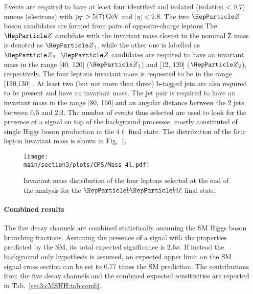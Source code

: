 Events are required to have at least four identified and isolated (isolation < 0.7) muons (electrons) with $\mathrm{p}_{T} > 5(7)\,\text{Ge\hspace{-.08em}V}$ and $|\eta|< 2.8$. 
The two $\PZ$ boson candidates are formed from pairs of opposite-charge leptons
The $\PZ$ candidate with the invariant mass closest to the nominal Z mass is denoted as $\PZ_1$, while the other one is labelled as $\PZ_2$.
$\PZ$ candidates are required to have an invariant mass in the range [40, 120] \UGeV ($\PZ_1$) and [12, 120] \UGeV ($\PZ_2$), respectively.
The four leptons invariant mass is requested to be in the range [120,130] \UGeV.
At least two (but not more than three) b-tagged jets are also required to be  present  and have an invariant mass.
The jet pair is required to have an invariant mass in the range [80, 160] \UGeV and an angular distance between the 2 jets between 0.5 and 2.3.
The number of events thus selected are used to look for the presence of a signal on top of the background processes, mostly constituted of single Higgs boson production in the $4\ell$ final state.
The distribution of the four lepton invariant mass is shown in  Fig,~\ref{sec3:CMSHH:fig:bbZZ_events}.


\begin{figure}[!htb]
  \begin{center}
    \texttt{[image: \\main/section3/plots/CMS/Mass\_4l.pdf]}
    \caption{Invariant mass distribution of the four leptons selected at the end of the analysis for the $\PQb\PQb 4\ell$ final state.}
    \label{sec3:CMSHH:fig:bbZZ_events}
  \end{center}
\end{figure}


\paragraph{Combined results}

The five decay channels are combined statistically assuming the SM Higgs boson branching fractions.
Assuming the presence of a signal with the properties predicted by the SM, its total expected  significance is $2.6\sigma$.
If instead the background only hypothesis is assumed, an expected upper limit on the SM \HH signal cross section can be set to 0.77 times the SM prediction.
The contributions from the five decay channels and the combined expected sensitivities are reported in Tab.~\ref{sec3:cMSHH:tab:comb}.

